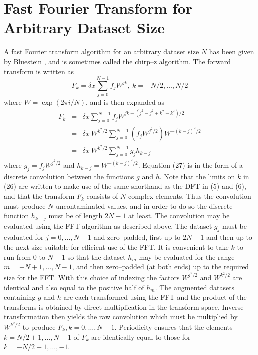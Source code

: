 \documentclass[dvips]{article}
\begin{document}
\section*{Fast Fourier Transform for Arbitrary Dataset Size}
A fast Fourier transform algorithm for an arbitrary dataset size $N$
has been given by Bluestein \cite{bluestein}, and is sometimes called
the chirp--z algorithm.  The forward transform is
written as
\begin{equation}
F_{k} = \delta x \sum_{j=0}^{N-1}f_{j}W^{jk},
\ k = -N/2,\ldots,N/2
\end{equation}
where $W = \exp{(2\pi i/N)}$, and is then expanded as
\begin{eqnarray}
F_{k} & = & \delta x \sum_{j=0}^{N-1}f_{j}
W^{jk + (j^{2}-j^{2}+k^{2}-k^{2})/2} \nonumber \\
      & = & \delta x\ W^{k^{2}/2}\sum_{j=0}^{N-1}\left(f_{j}W^{j^{2}/2}\right)
W^{-(k-j)^{2}/2} \nonumber \\
      & = & \delta x\ W^{k^{2}/2}\sum_{j=0}^{N-1}g_{j}h_{k-j}
\end{eqnarray}
where $g_{j} = f_{j}W^{j^{2}/2}$ and $h_{k-j} = W^{-(k-j)^{2}/2}$.
Equation (27) is in the form of a discrete convolution between the
functions $g$ and $h$.  Note that the limits on $k$ in (26) are written
to make use of the same shorthand as the DFT in (5) and (6), and that
the transform $F_{k}$ consists of $N$ complex elements.  Thus the
convolution must produce $N$ uncontaminated values, and in order to do
so the discrete function $h_{k-j}$ must be of length $2N-1$ at least.
The convolution may be evaluated using the FFT
algorithm as described above.  The dataset $g_{j}$ must be
evaluated for $j=0,\ldots ,N-1$ and zero--padded, first up to $2N-1$ and
then up to the next size suitable for efficient use of the FFT.
It is convenient to take $k$ to run from $0$ to $N-1$ so that the dataset
$h_{m}$ may be evaluated for the range $m=-N+1,\ldots ,N-1$, and then
zero--padded (at both ends) up to the required size for the FFT.  With this
choice of indexing the factors $W^{j^{2}/2}$ and $W^{k^{2}/2}$ are identical
and also equal to the positive half of $h_{m}$.  
The augmented datasets containing $g$ and $h$ are each transformed
using the FFT and the product of the transforms is obtained by direct
multiplication in the transform space.  Inverse transformation
then yields the raw convolution
which must be multiplied by $W^{k^{2}/2}$ to produce $F_{k}, k=
0,\ldots ,N-1$.  Periodicity ensures
that the elements $k = N/2+1,\ldots ,N-1$ of $F_{k}$ are identically
equal to those for $k = -N/2+1,\ldots ,-1$.
 
\end{document}
